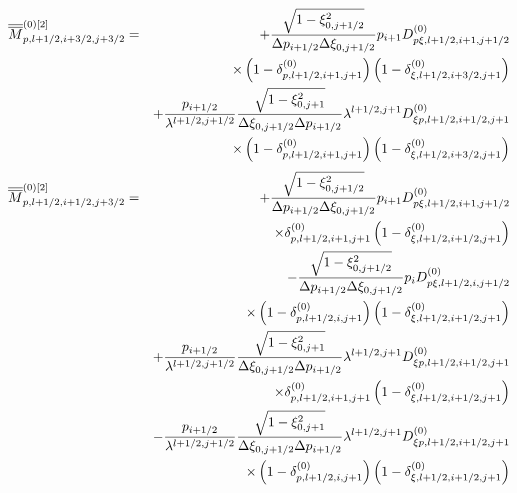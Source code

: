 \begin{eqnarray}
\overline{\overline{M}}_{p,l+1/2,i+3/2,j+3/2}^{\left( 0\right) \left[ 2%
\right] } &=&+\frac{\sqrt{1-\xi _{0,j+1/2}^{2}}}{\Delta p_{i+1/2}\Delta \xi
_{0,j+1/2}}p_{i+1}D_{p\xi ,l+1/2,i+1,j+1/2}^{\left( 0\right) }  \notag \\
&&\times \left( 1-\delta _{p,l+1/2,i+1,j+1}^{\left( 0\right) }\right) \left(
1-\delta _{\xi ,l+1/2,i+3/2,j+1}^{\left( 0\right) }\right)   \notag \\
&&+\frac{p_{i+1/2}}{\lambda ^{l+1/2,j+1/2}}\frac{\sqrt{1-\xi _{0,j+1}^{2}}}{%
\Delta \xi _{0,j+1/2}\Delta p_{i+1/2}}\lambda ^{l+1/2,j+1}D_{\xi
p,l+1/2,i+1/2,j+1}^{\left( 0\right) }  \notag \\
&&\times \left( 1-\delta _{p,l+1/2,i+1,j+1}^{\left( 0\right) }\right) \left(
1-\delta _{\xi ,l+1/2,i+3/2,j+1}^{\left( 0\right) }\right) 
\end{eqnarray}%
\begin{eqnarray}
\overline{\overline{M}}_{p,l+1/2,i+1/2,j+3/2}^{\left( 0\right) \left[ 2%
\right] } &=&+\frac{\sqrt{1-\xi _{0,j+1/2}^{2}}}{\Delta p_{i+1/2}\Delta \xi
_{0,j+1/2}}p_{i+1}D_{p\xi ,l+1/2,i+1,j+1/2}^{\left( 0\right) }  \notag \\
&&\times \delta _{p,l+1/2,i+1,j+1}^{\left( 0\right) }\left( 1-\delta _{\xi
,l+1/2,i+1/2,j+1}^{\left( 0\right) }\right)   \notag \\
&&-\frac{\sqrt{1-\xi _{0,j+1/2}^{2}}}{\Delta p_{i+1/2}\Delta \xi _{0,j+1/2}}%
p_{i}D_{p\xi ,l+1/2,i,j+1/2}^{\left( 0\right) }  \notag \\
&&\times \left( 1-\delta _{p,l+1/2,i,j+1}^{\left( 0\right) }\right) \left(
1-\delta _{\xi ,l+1/2,i+1/2,j+1}^{\left( 0\right) }\right)   \notag \\
&&+\frac{p_{i+1/2}}{\lambda ^{l+1/2,j+1/2}}\frac{\sqrt{1-\xi _{0,j+1}^{2}}}{%
\Delta \xi _{0,j+1/2}\Delta p_{i+1/2}}\lambda ^{l+1/2,j+1}D_{\xi
p,l+1/2,i+1/2,j+1}^{\left( 0\right) }  \notag \\
&&\times \delta _{p,l+1/2,i+1,j+1}^{\left( 0\right) }\left( 1-\delta _{\xi
,l+1/2,i+1/2,j+1}^{\left( 0\right) }\right)   \notag \\
&&-\frac{p_{i+1/2}}{\lambda ^{l+1/2,j+1/2}}\frac{\sqrt{1-\xi _{0,j+1}^{2}}}{%
\Delta \xi _{0,j+1/2}\Delta p_{i+1/2}}\lambda ^{l+1/2,j+1}D_{\xi
p,l+1/2,i+1/2,j+1}^{\left( 0\right) }  \notag \\
&&\times \left( 1-\delta _{p,l+1/2,i,j+1}^{\left( 0\right) }\right) \left(
1-\delta _{\xi ,l+1/2,i+1/2,j+1}^{\left( 0\right) }\right) 
\end{eqnarray}%
